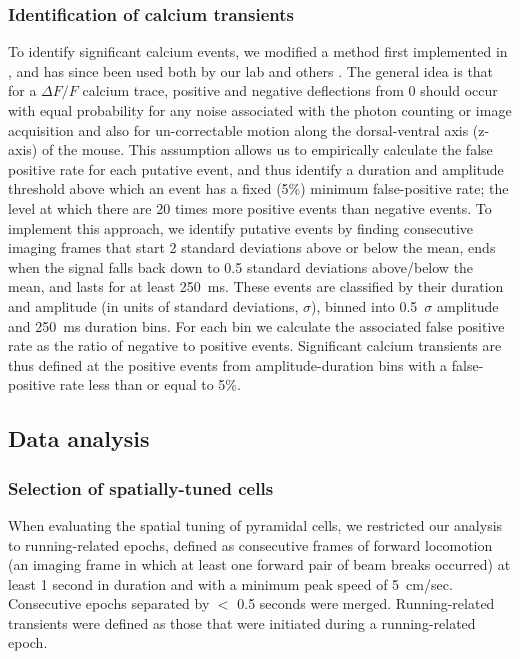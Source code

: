 \subsubsection{Identification of calcium transients}\label{sec:df:methods:transients}
To identify significant calcium events, we modified a method first implemented in \citealt{Dombeck2007}, and has since been used both by our lab \citep{Danielson2016a, Danielson2016b, Lovett-Barron2014} and others \citep{Dombeck2010, Rajasethupathy2015}. The general idea is that for a $\Delta F/F$ calcium trace, positive and negative deflections from 0 should occur with equal probability for any noise associated with the photon counting or image acquisition and also for un-correctable motion along the dorsal-ventral axis (z-axis) of the mouse. This assumption allows us to empirically calculate the false positive rate for each putative event, and thus identify a duration and amplitude threshold above which an event has a fixed (5\%) minimum false-positive rate; the level at which there are 20 times more positive events than negative events. To implement this approach, we identify putative events by finding consecutive imaging frames that start 2 standard deviations above or below the mean, ends when the signal falls back down to 0.5 standard deviations above/below the mean, and lasts for at least 250~ms. These events are classified by their duration and amplitude (in units of standard deviations, $\sigma$), binned into 0.5~$\sigma$ amplitude and 250~ms duration bins. For each bin we calculate the associated false positive rate as the ratio of negative to positive events. Significant calcium transients are thus defined at the positive events from amplitude-duration bins with a false-positive rate less than or equal to 5\%.

\subsection{Data analysis}
\subsubsection{Selection of spatially-tuned cells}\label{sec:df:methods:pc_identification}
When evaluating the spatial tuning of pyramidal cells, we restricted our analysis to running-related epochs, defined as consecutive frames of forward locomotion (an imaging frame in which at least one forward pair of beam breaks occurred) at least 1 second in duration and with a minimum peak speed of 5~cm/sec. Consecutive epochs separated by $<$ 0.5 seconds were merged. Running-related transients were defined as those that were initiated during a running-related epoch.

